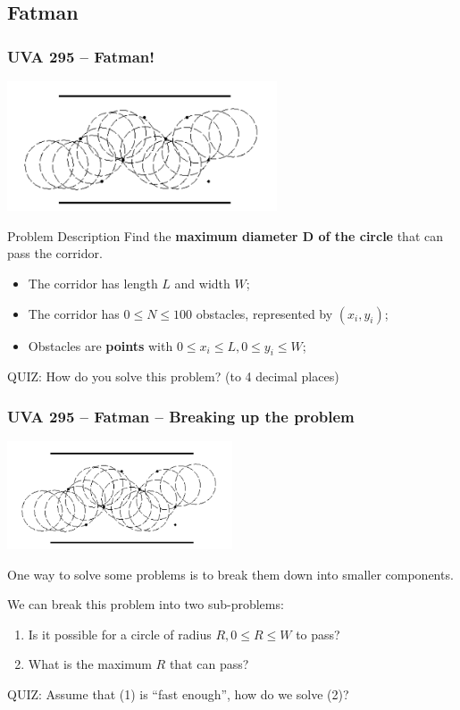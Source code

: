 \subsection{Fatman}
\begin{frame}
  \frametitle{UVA 295 -- Fatman!}
  \begin{center}
    \includegraphics[width=0.6\textwidth]{img/fatman}
  \end{center}

  {\smaller
    \begin{block}{Problem Description}
      Find the {\bf maximum diameter D of the circle} that can pass the corridor.
      \begin{itemize}
      \item The corridor has length $L$ and width $W$;
      \item The corridor has $0 \leq N \leq 100$ obstacles, represented by $(x_i,y_i)$;
      \item Obstacles are {\bf points} with $0 \leq x_i \leq L, 0\leq y_i \leq W$;
      \end{itemize}
    \end{block}

    \alert{QUIZ:} How do you solve this problem? (to 4 decimal places)
  }
\end{frame}

\begin{frame}
  \frametitle{UVA 295 -- Fatman -- Breaking up the problem}
  \begin{center}
    \includegraphics[width=0.5\textwidth]{img/fatman}
  \end{center}

  {\smaller
  One way to solve some problems is to break them down into smaller
  components.

  \bigskip

  We can break this problem into two sub-problems:
  \begin{block}{}
  \begin{enumerate}
  \item Is it possible for a circle of radius $R, 0 \leq R \leq W$ to pass?
  \item What is the maximum $R$ that can pass?
  \end{enumerate}
  \end{block}

  \alert{QUIZ}: Assume that (1) is ``fast enough'', how do we solve (2)?
  }
\end{frame}

